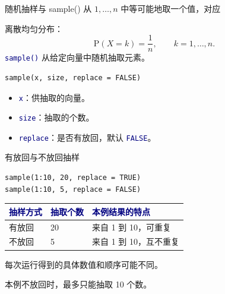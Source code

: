 \documentclass[14pt,compress,t,noamsthm,notheorem,table,handout,fontset=none]{ctexbeamer}
\newcommand{\code}[1]{\textcolor{navy}{\texttt{#1}}}
\newcommand{\inputlabel}{\par\smallskip{\fontsize{10.5}{13}\selectfont\bfseries\color{muted}输入代码\par}}
\newcommand{\thead}[1]{\textcolor{navy}{\textbf{#1}}}
\begin{document}
\begin{frame}[fragile]{随机抽样与 sample()}
  \small
  从 $1,\ldots,n$ 中等可能地取一个值，对应\par
  离散均匀分布：
  \[
    \mathrm{P}(X=k)=\frac{1}{n},\qquad k=1,\ldots,n.
  \]
  \code{sample()} 从给定向量中随机抽取元素。
  \inputlabel
\begin{lstlisting}
sample(x, size, replace = FALSE)
\end{lstlisting}
  \begin{itemize}
    \item \code{x}：供抽取的向量。
    \item \code{size}：抽取的个数。
    \item \code{replace}：是否有放回，默认 \code{FALSE}。
  \end{itemize}
\end{frame}

\begin{frame}[fragile]{有放回与不放回抽样}
  \inputlabel
\begin{lstlisting}
sample(1:10, 20, replace = TRUE)
sample(1:10, 5, replace = FALSE)
\end{lstlisting}
  \small
  \renewcommand{\arraystretch}{1.2}
  \begin{tabular*}{\linewidth}{@{\extracolsep{\fill}}lll@{}}
    \toprule
    \thead{抽样方式} & \thead{抽取个数} & \thead{本例结果的特点} \\
    \midrule
    有放回 & 20 & 来自 1 到 10，可重复 \\
    不放回 & 5 & 来自 1 到 10，互不重复 \\
    \bottomrule
  \end{tabular*}
  \par\vspace{0.5em}
  每次运行得到的具体数值和顺序可能不同。\par
  本例不放回时，最多只能抽取 10 个数。
\end{frame}
\end{document}
